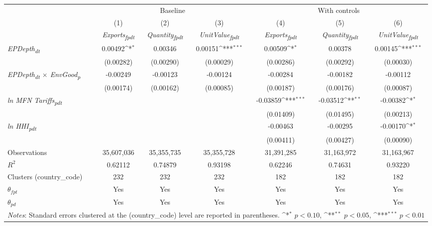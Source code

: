 {
\def\sym#1{\ifmmode^{#1}\else\(^{#1}\)\fi}
\begin{tabular}{l*{6}{c}}
\toprule
&\multicolumn{3}{c}{Baseline}&\multicolumn{3}{c}{With controls}\\\cmidrule(lr){2-4}\cmidrule(lr){5-7}
&(1)&(2)&(3)&(4)&(5)&(6)\\
&\textit{Exports\textsubscript{fpdt}}&\textit{Quantity\textsubscript{fpdt}}&\textit{UnitValue\textsubscript{fpdt}}&\textit{Exports\textsubscript{fpdt}}&\textit{Quantity\textsubscript{fpdt}}&\textit{UnitValue\textsubscript{fpdt}}\\
\midrule
\textit{EPDepth\textsubscript{dt}} & 0.00492\sym{*} & 0.00346 & 0.00151\sym{***} & 0.00509\sym{*} & 0.00378 & 0.00145\sym{***}\\
 & (0.00282) & (0.00290) & (0.00029) & (0.00286) & (0.00292) & (0.00030)\\
\addlinespace
\textit{EPDepth\textsubscript{dt} $\times$ EnvGood\textsubscript{p}} & -0.00249 & -0.00123 & -0.00124 & -0.00284 & -0.00182 & -0.00112\\
 & (0.00174) & (0.00162) & (0.00085) & (0.00187) & (0.00176) & (0.00087)\\
\addlinespace
\textit{ln MFN Tariffs\textsubscript{pdt}} &  &  &  & -0.03859\sym{***} & -0.03512\sym{**} & -0.00382\sym{*}\\
 &  &  &  & (0.01409) & (0.01495) & (0.00213)\\
\addlinespace
\textit{ln HHI\textsubscript{pdt}} &  &  &  & -0.00463 & -0.00295 & -0.00170\sym{*}\\
 &  &  &  & (0.00411) & (0.00427) & (0.00090)\\
\midrule
Observations & 35,607,036 & 35,355,735 & 35,355,728 & 31,391,285 & 31,163,972 & 31,163,967\\
$R^{2}$ & 0.62112 & 0.74879 & 0.93198 & 0.62246 & 0.74631 & 0.93220\\
Clusters (country_code) & 232 & 232 & 232 & 182 & 182 & 182\\
$\theta_{fpt}$ & Yes & Yes & Yes & Yes & Yes & Yes\\
$\theta_{pd}$ & Yes & Yes & Yes & Yes & Yes & Yes\\
\bottomrule
\multicolumn{7}{l}{\footnotesize \textit{Notes}: Standard errors clustered at the (country_code) level are reported in parentheses. \sym{*} \(p<0.10\), \sym{**} \(p<0.05\), \sym{***} \(p<0.01\)}\\
\end{tabular}
}

